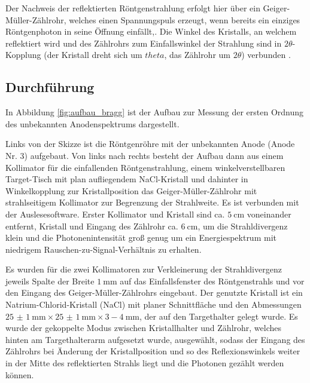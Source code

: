 Der Nachweis der reflektierten Röntgenstrahlung erfolgt hier über ein Geiger-Müller-Zählrohr, welches einen Spannungspuls erzeugt, wenn bereits ein einziges Röntgenphoton in seine Öffnung einfällt\cite{Versuchsanleitung428},\cite[482-483]{gerthsen}. Die Winkel des Kristalls, an welchem reflektiert wird und des Zählrohrs zum Einfallswinkel der Strahlung sind in $2\theta$-Kopplung (der Kristall dreht sich um $theta$, das Zählrohr um $2\theta$) verbunden \cite{LDgoniometer}.

\subsection{Durchführung}

In Abbildung \ref{fig:aufbau_bragg} ist der Aufbau zur Messung der ersten Ordnung des unbekannten Anodenspektrums dargestellt.


Links von der Skizze ist die Röntgenröhre mit der unbekannten Anode (Anode Nr. 3) aufgebaut. Von links nach rechts besteht der Aufbau dann aus einem Kollimator für die einfallenden Röntgenstrahlung, einem winkelverstellbaren Target-Tisch mit plan aufliegendem NaCl-Kristall und dahinter in Winkelkopplung zur Kristallposition das Geiger-Müller-Zählrohr mit strahlseitigem Kollimator zur Begrenzung der Strahlweite. Es ist verbunden mit der Auslesesoftware. Erster Kollimator und Kristall sind ca. $\SI{5}{\centi\meter}$ voneinander entfernt, Kristall und Eingang des Zählrohr ca. $\SI{6}{\centi\meter}$\cite[4]{Versuchsanleitung428}, um die Strahldivergenz klein und die Photonenintensität groß genug um ein Energiespektrum mit niedrigem Rauschen-zu-Signal-Verhältnis zu erhalten.

Es wurden für die zwei Kollimatoren zur Verkleinerung der Strahldivergenz jeweils Spalte der Breite $\SI{1}{\milli\meter}$ auf das Einfallsfenster des Röntgenstrahls und vor den Eingang des Geiger-Müller-Zählrohrs eingebaut. Der genutzte Kristall ist ein Natrium-Chlorid-Kristall (NaCl) mit planer Schnittfläche und den Abmessungen $\SI{25(1)}{\milli\meter}\times\SI{25(1)}{\milli\meter}\times\unit{3-4}{~\text{mm}}$, der auf den Targethalter gelegt wurde. Es wurde der gekoppelte Modus zwischen Kristallhalter und Zählrohr, welches hinten am Targethalterarm aufgesetzt wurde, ausgewählt, sodass der Eingang des Zählrohrs bei Änderung der Kristallposition und so des Reflexionswinkels weiter in der Mitte des reflektierten Strahls liegt und die Photonen gezählt werden können.


